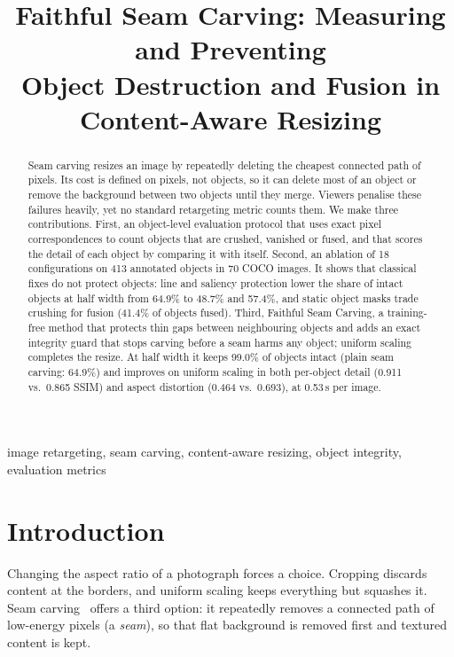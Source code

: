 \documentclass[conference]{IEEEtran}
\newcommand{\ours}{Faithful Seam Carving}
\begin{document}
\title{Faithful Seam Carving: Measuring and Preventing\\Object Destruction and Fusion in Content-Aware Resizing}

\author{
}

\maketitle

\begin{abstract}
Seam carving resizes an image by repeatedly deleting the cheapest connected path of pixels. Its cost is defined on pixels, not objects, so it can delete most of an object or remove the background between two objects until they merge. Viewers penalise these failures heavily, yet no standard retargeting metric counts them. We make three contributions. First, an object-level evaluation protocol that uses exact pixel correspondences to count objects that are crushed, vanished or fused, and that scores the detail of each object by comparing it with itself. Second, an ablation of 18 configurations on 413 annotated objects in 70 COCO images. It shows that classical fixes do not protect objects: line and saliency protection lower the share of intact objects at half width from 64.9\% to 48.7\% and 57.4\%, and static object masks trade crushing for fusion (41.4\% of objects fused). Third, \ours{}, a training-free method that protects thin gaps between neighbouring objects and adds an exact integrity guard that stops carving before a seam harms any object; uniform scaling completes the resize. At half width it keeps 99.0\% of objects intact (plain seam carving: 64.9\%) and improves on uniform scaling in both per-object detail (0.911 vs.\ 0.865 SSIM) and aspect distortion (0.464 vs.\ 0.693), at 0.53\,s per image.
\end{abstract}

\begin{IEEEkeywords}
image retargeting, seam carving, content-aware resizing, object integrity, evaluation metrics
\end{IEEEkeywords}

\section{Introduction}

Changing the aspect ratio of a photograph forces a choice. Cropping discards content at the borders, and uniform scaling keeps everything but squashes it. Seam carving~\cite{avidan2007seam} offers a third option: it repeatedly removes a connected path of low-energy pixels (a \emph{seam}), so that flat background is removed first and textured content is kept.
\end{document}
